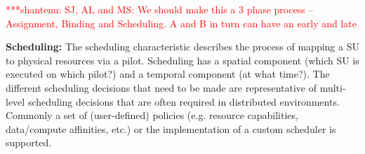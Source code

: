 \documentclass[conference,final]{IEEEtran}
\newcommand{\jhanote}[1]{ {\textcolor{red} { ***shantenu: #1 }}}
\newcommand{\alnote}[1]{ {\textcolor{blue} { ***andre: #1 }}}
\newcommand{\alnote}[1]{}
\newcommand{\jhanote}[1]{}
\begin{document}
\jhanote{SJ, AL and MS: We should make this a 3 phase process --
  Assignment, Binding and Scheduling. A and B in turn can have an
  early and late}






\textbf{Scheduling:} The scheduling characteristic describes the process of
mapping a SU to physical resources via a pilot. Scheduling has a spatial
component (which SU is executed on which pilot?) and a temporal component (at
what time?). The different scheduling decisions that need to be made are
representative of multi-level scheduling decisions that are often required in
distributed environments. Commonly a set of (user-defined) policies (e.g.
resource capabilities, data/compute affinities, etc.) or the implementation of a
custom scheduler is supported.
\end{document}

